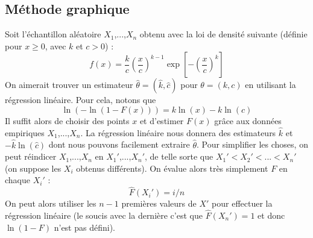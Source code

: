 \subsection{Méthode graphique}
Soit l'échantillon aléatoire $X_1$,...,$X_n$ obtenu avec la loi de densité suivante (définie pour $x \geq 0$, avec $k$ et $c > 0$) :
$$ f(x) = \frac{k}{c}\left(\frac{x}{c}\right)^{k-1}\exp\left[-\left(\frac{x}{c}\right)^{k}\right] $$ 
On aimerait trouver un estimateur $\hat{\theta} = (\hat{k},\hat{c})$ pour $\theta = (k,c)$ en utilisant la régression linéaire.
Pour cela, notons que
$$ \ln(-\ln(1-F(x))) = k\ln(x)-k\ln(c) $$
Il suffit alors de choisir des points $x$ et d'estimer $F(x)$ grâce aux données empiriques $X_1$,...,$X_n$. La régression linéaire nous donnera des estimateurs $\hat{k}$ et $-\hat{k}\ln(\hat{c})$ dont nous pouvons facilement extraire $\hat{\theta}$. Pour simplifier les choses, on peut réindicer $X_1$,...,$X_n$ en $X_1'$,...,$X_n'$, de telle sorte que $X_1'<X_2'<$...$<X_n'$ (on suppose les $X_i$ obtenus différents). On évalue alors très simplement $F$ en chaque $X_i'$ : 
$$ \hat{F}(X_i') = i/n $$
On peut alors utiliser les $n-1$ premières valeurs de $X'$ pour effectuer la régression linéaire (le soucis avec la dernière c'est que $\hat{F}(X_n') = 1$ et donc $\ln(1-F)$ n'est pas défini).